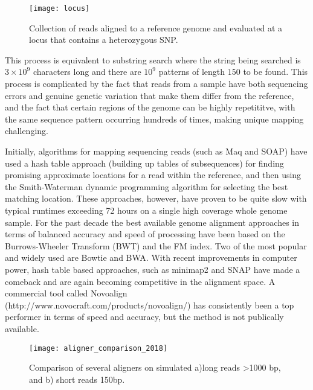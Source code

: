 \begin{figure}[H]
    \texttt{[image: locus]}
    \centering
    \caption {Collection of reads aligned to a reference genome and evaluated at a locus that contains a heterozygous SNP.}
    \label{fig:locus}
\end{figure}

This process is equivalent to substring search where the string being searched is $3\times10^9$ characters long and there are $10^9$ patterns of length $150$ to be found. This process is complicated by the fact that reads from a sample have both sequencing errors and genuine genetic variation that make them differ from the reference, and the fact that certain regions of the genome can be highly repetititve, with the same sequence pattern occurring hundreds of times, making unique mapping challenging.

Initially, algorithms for mapping sequencing reads (such as Maq\autocite{li2008mapping} and SOAP\autocite{li2008soap}) have used a hash table approach\autocite{reinert2015alignment} (building up tables of subsequences) for finding promising approximate locations for a read within the reference, and then using the Smith-Waterman\autocite{smith1981comparison} dynamic programming algorithm for selecting the best matching location. These approaches, however, have proven to be quite slow with typical runtimes exceeding 72 hours on a single high coverage whole genome sample. For the past decade the best available genome alignment approaches in terms of balanced accuracy and speed of processing have been based on the Burrows-Wheeler Transform (BWT)\autocite{burrows1994block} and the FM index\autocite{ferragina2000opportunistic}. Two of the most popular and widely used are Bowtie\autocite{langmead2009ultrafast} and BWA\autocite{li2009fast}. With recent improvements in computer power, hash table based approaches, such as minimap2\autocite{li2018minimap2} and SNAP\autocite{zaharia2011faster} have made a comeback and are again becoming competitive in the alignment space. A commercial tool called Novoalign (http://www.novocraft.com/products/novoalign/) has consistently been a top performer in terms of speed and accuracy, but the method is not publically available.

\begin{figure}[H]
    \texttt{[image: aligner\_comparison\_2018]}
    \centering
    \caption {Comparison of several aligners on simulated a)long reads >1000 bp, and b) short reads 150bp.\autocite{li2018minimap2}}
    \label{fig:aligner_comparison_2018}
\end{figure}

